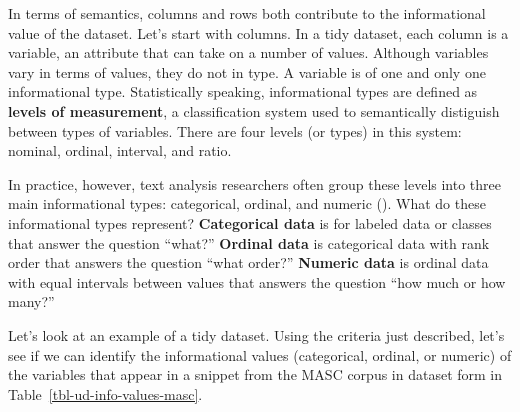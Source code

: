 \documentclass[
  letterpaper,
  DIV=11,
  numbers=noendperiod]{scrreprt}
\theoremstyle{definition}
\theoremstyle{remark}
\begin{document}
In terms of semantics, columns and rows both contribute to the
informational value of the dataset. Let's start with columns. In a tidy
dataset, each column is a variable, an attribute that can take on a
number of values. Although variables vary in terms of values, they do
not in type. A variable is of one and only one informational type.
Statistically speaking, informational types are defined as
\textbf{levels of measurement}, a classification system used to
semantically distiguish between types of variables. There are four
levels (or types) in this system: nominal, ordinal, interval, and ratio.

In practice, however, text analysis researchers often group these levels
into three main informational types: categorical, ordinal, and numeric
(). What do these
informational types represent? \textbf{Categorical data} is for labeled
data or classes that answer the question ``what?'' \textbf{Ordinal data}
is categorical data with rank order that answers the question ``what
order?'' \textbf{Numeric data} is ordinal data with equal intervals
between values that answers the question ``how much or how many?''

Let's look at an example of a tidy dataset. Using the criteria just
described, let's see if we can identify the informational values
(categorical, ordinal, or numeric) of the variables that appear in a
snippet from the MASC corpus in dataset form in
Table~\ref{tbl-ud-info-values-masc}.
\end{document}
